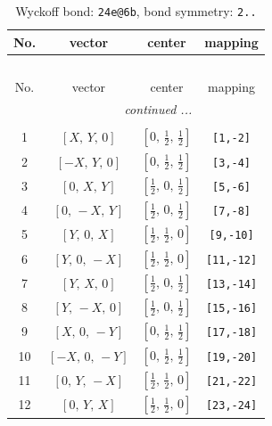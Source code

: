 \documentclass[fleqn,8pt]{jsarticle}
\begin{document}
\renewcommand{\arraystretch}{1.2}
\begin{longtable}{cccc}
\caption{Wyckoff bond: {\tt 24e@6b}, bond symmetry: {\tt 2..}}
 \\
 \hline \hline
No. & vector & center & mapping \\ \hline \endfirsthead

\multicolumn{3}{l}{\tablename\ \thetable{}} \\
 \hline \hline
No. & vector & center & mapping \\ \hline \endhead

 \hline \hline
\multicolumn{3}{r}{\footnotesize\it continued ...} \\ \endfoot

 \hline \hline
\multicolumn{3}{r}{} \\ \endlastfoot

1 & $\left[ X,\, Y,\, 0 \right]$ & $\left[ 0,\, \frac{1}{2},\, \frac{1}{2} \right]$ & {\tt [1,-2]} \\ \hline
2 & $\left[ - X,\, Y,\, 0 \right]$ & $\left[ 0,\, \frac{1}{2},\, \frac{1}{2} \right]$ & {\tt [3,-4]} \\ \hline
3 & $\left[ 0,\, X,\, Y \right]$ & $\left[ \frac{1}{2},\, 0,\, \frac{1}{2} \right]$ & {\tt [5,-6]} \\ \hline
4 & $\left[ 0,\, - X,\, Y \right]$ & $\left[ \frac{1}{2},\, 0,\, \frac{1}{2} \right]$ & {\tt [7,-8]} \\ \hline
5 & $\left[ Y,\, 0,\, X \right]$ & $\left[ \frac{1}{2},\, \frac{1}{2},\, 0 \right]$ & {\tt [9,-10]} \\ \hline
6 & $\left[ Y,\, 0,\, - X \right]$ & $\left[ \frac{1}{2},\, \frac{1}{2},\, 0 \right]$ & {\tt [11,-12]} \\ \hline
7 & $\left[ Y,\, X,\, 0 \right]$ & $\left[ \frac{1}{2},\, 0,\, \frac{1}{2} \right]$ & {\tt [13,-14]} \\ \hline
8 & $\left[ Y,\, - X,\, 0 \right]$ & $\left[ \frac{1}{2},\, 0,\, \frac{1}{2} \right]$ & {\tt [15,-16]} \\ \hline
9 & $\left[ X,\, 0,\, - Y \right]$ & $\left[ 0,\, \frac{1}{2},\, \frac{1}{2} \right]$ & {\tt [17,-18]} \\ \hline
10 & $\left[ - X,\, 0,\, - Y \right]$ & $\left[ 0,\, \frac{1}{2},\, \frac{1}{2} \right]$ & {\tt [19,-20]} \\ \hline
11 & $\left[ 0,\, Y,\, - X \right]$ & $\left[ \frac{1}{2},\, \frac{1}{2},\, 0 \right]$ & {\tt [21,-22]} \\ \hline
12 & $\left[ 0,\, Y,\, X \right]$ & $\left[ \frac{1}{2},\, \frac{1}{2},\, 0 \right]$ & {\tt [23,-24]} \\
\end{longtable}
\end{document}
